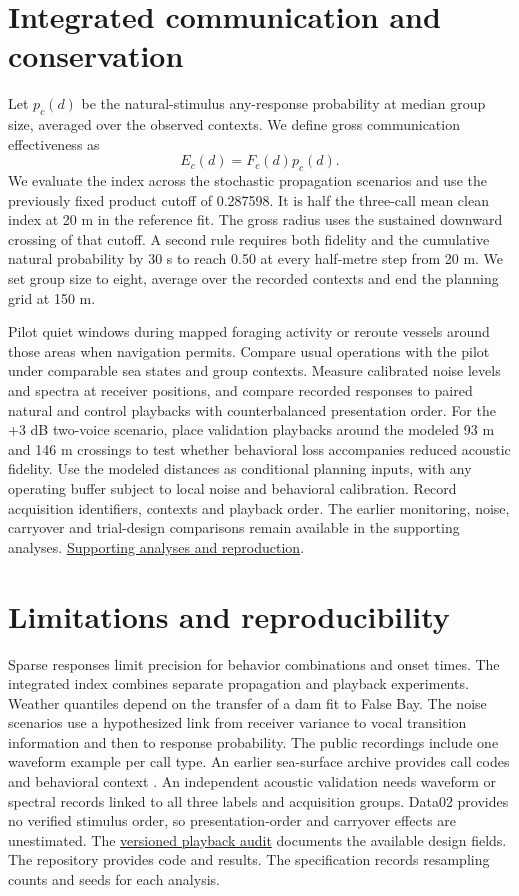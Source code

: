 \documentclass[11pt,a4paper]{article}
\newcommand{\coreevidence}[2]{\href{https://github.com/feiniao87968492-stack/apmcm-2026-problem-c/blob/0b74512/#1}{#2}}
\begin{document}
\BehaviorResults

\clearpage
\section{Integrated communication and conservation}
Let $p_c(d)$ be the natural-stimulus any-response probability at median group size, averaged over the observed contexts. We define gross communication effectiveness as
\[
E_c(d)=F_c(d)p_c(d).
\]
We evaluate the index across the stochastic propagation scenarios and use the previously fixed product cutoff of 0.287598. It is half the three-call mean clean index at 20 m in the reference fit. The gross radius uses the sustained downward crossing of that cutoff. A second rule requires both fidelity and the cumulative natural probability by 30 s to reach 0.50 at every half-metre step from 20 m. We set group size to eight, average over the recorded contexts and end the planning grid at 150 m.

\IntegratedResults

Pilot quiet windows during mapped foraging activity or reroute vessels around those areas when navigation permits. Compare usual operations with the pilot under comparable sea states and group contexts. Measure calibrated noise levels and spectra at receiver positions, and compare recorded responses to paired natural and control playbacks with counterbalanced presentation order. For the +3 dB two-voice scenario, place validation playbacks around the modeled 93 m and 146 m crossings to test whether behavioral loss accompanies reduced acoustic fidelity. Use the modeled distances as conditional planning inputs, with any operating buffer subject to local noise and behavioral calibration. Record acquisition identifiers, contexts and playback order. The earlier monitoring, noise, carryover and trial-design comparisons remain available in the supporting analyses. \coreevidence{README.md}{Supporting analyses and reproduction}.

\section{Limitations and reproducibility}
Sparse responses limit precision for behavior combinations and onset times. The integrated index combines separate propagation and playback experiments. Weather quantiles depend on the transfer of a dam fit to False Bay. The noise scenarios use a hypothesized link from receiver variance to vocal transition information and then to response probability. The public recordings include one waveform example per call type. An earlier sea-surface archive provides call codes and behavioral context \cite{earliersurface}. An independent acoustic validation needs waveform or spectral records linked to all three labels and acquisition groups. Data02 provides no verified stimulus order, so presentation-order and carryover effects are unestimated. The \href{https://github.com/feiniao87968492-stack/apmcm-2026-problem-c/blob/aaaff78e98df91bc998fa1359171050e7b1967a8/docs/data-audit.md\#playback-design-and-order-recoverability}{versioned playback audit} documents the available design fields. The repository provides code and results. The specification records resampling counts and seeds for each analysis.
\end{document}
